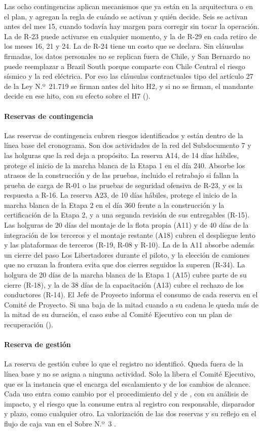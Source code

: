 Las ocho contingencias aplican mecanismos que ya están en la arquitectura o en el plan, y agregan la
regla de cuándo se activan y quién decide. Seis se activan antes del mes 15, cuando todavía hay margen
para corregir sin tocar la operación. La de R-23 puede activarse en cualquier momento, y la de R-29 en
cada retiro de los meses 16, 21 y 24. La de R-24 tiene un costo que se declara. Sin cláusulas firmadas,
los datos personales no se replican fuera de Chile, y San Bernardo no puede reemplazar a Brazil South
porque comparte con Chile Central el riesgo sísmico y la red eléctrica. Por eso las cláusulas
contractuales tipo del artículo 27 de la Ley N.º~21.719 se firman antes del hito H2, y si no se firman,
el mandante decide en ese hito, con su efecto sobre el H7 ().

\paragraph{Reservas de contingencia}
Las reservas de contingencia cubren riesgos identificados y están dentro de la línea base del
cronograma. Son dos actividades de la red del Subdocumento 7 y las holguras que la red deja a propósito.
La reserva A14, de 14 días hábiles, protege el inicio de la marcha blanca de la Etapa 1 en el día 240.
Absorbe los atrasos de la construcción y de las pruebas, incluido el retrabajo si fallan la prueba de
carga de R-01 o las pruebas de seguridad ofensiva de R-23, y es la respuesta a R-16. La reserva A23, de
10 días hábiles, protege el inicio de la marcha blanca de la Etapa 2 en el día 360 frente a la
construcción y la certificación de la Etapa 2, y a una segunda revisión de sus entregables (R-15). Las
holguras de 20 días del montaje de la flota propia (A11) y de 40 días de la integración de los terceros
y el montaje restante (A18) cubren el despliegue lento y las plataformas de terceros (R-19, R-08 y R-10).
La de la A11 absorbe además un cierre del paso Los Libertadores durante el piloto, y la elección de
camiones que no cruzan la frontera evita que dos cierres seguidos la superen (R-34).
La holgura de 20 días de la marcha blanca de la Etapa 1 (A15) cubre parte de su cierre (R-18), y la de 38
días de la capacitación (A13) cubre el rechazo de los conductores (R-14). El Jefe de Proyecto informa el
consumo de cada reserva en el Comité de Proyecto. Si una baja de la mitad cuando a su cadena le queda más
de la mitad de su duración, el caso sube al Comité Ejecutivo con un plan de recuperación
().

\paragraph{Reserva de gestión}
La reserva de gestión cubre lo que el registro no identificó. Queda fuera de la línea base y no se asigna
a ninguna actividad. Solo la libera el Comité Ejecutivo, que es la instancia que el  encarga
del escalamiento y de los cambios de alcance. Cada uso entra como cambio por el procedimiento del
 y de , con su análisis de impacto, y el riesgo que la consume entra al
registro con responsable, disparador y plazo, como cualquier otro. La valorización de las dos reservas y
su reflejo en el flujo de caja van en el Sobre N.º~3 .
